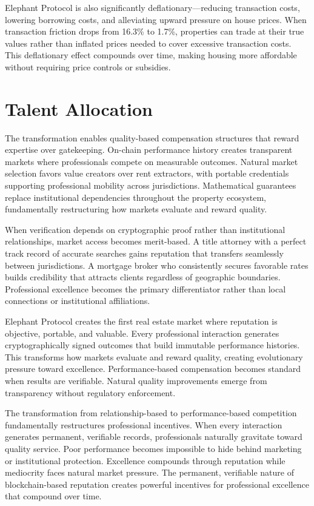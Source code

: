 Elephant Protocol is also significantly deflationary---reducing transaction costs, lowering borrowing costs, and alleviating upward pressure on house prices. When transaction friction drops from 16.3\% to 1.7\%, properties can trade at their true values rather than inflated prices needed to cover excessive transaction costs. This deflationary effect compounds over time, making housing more affordable without requiring price controls or subsidies.

\section{Talent Allocation}

The transformation enables quality-based compensation structures that reward expertise over gatekeeping. On-chain performance history creates transparent markets where professionals compete on measurable outcomes. Natural market selection favors value creators over rent extractors, with portable credentials supporting professional mobility across jurisdictions. Mathematical guarantees replace institutional dependencies throughout the property ecosystem, fundamentally restructuring how markets evaluate and reward quality.

When verification depends on cryptographic proof rather than institutional relationships, market access becomes merit-based. A title attorney with a perfect track record of accurate searches gains reputation that transfers seamlessly between jurisdictions. A mortgage broker who consistently secures favorable rates builds credibility that attracts clients regardless of geographic boundaries. Professional excellence becomes the primary differentiator rather than local connections or institutional affiliations.

Elephant Protocol creates the first real estate market where reputation is objective, portable, and valuable. Every professional interaction generates cryptographically signed outcomes that build immutable performance histories. This transforms how markets evaluate and reward quality, creating evolutionary pressure toward excellence. Performance-based compensation becomes standard when results are verifiable. Natural quality improvements emerge from transparency without regulatory enforcement.

The transformation from relationship-based to performance-based competition fundamentally restructures professional incentives. When every interaction generates permanent, verifiable records, professionals naturally gravitate toward quality service. Poor performance becomes impossible to hide behind marketing or institutional protection. Excellence compounds through reputation while mediocrity faces natural market pressure. The permanent, verifiable nature of blockchain-based reputation creates powerful incentives for professional excellence that compound over time.

